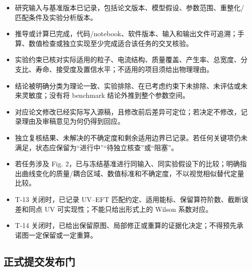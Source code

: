 \documentclass[
]{article}
\providecommand{\tightlist}{%
  \setlength{\itemsep}{0pt}\setlength{\parskip}{0pt}}
\begin{document}
\begin{itemize}
\tightlist
\item[$\square$]
  研究输入与基准版本已记录，包括论文版本、模型假设、参数范围、重整化/匹配条件及实验分析版本。
\item[$\square$]
  推导或计算已完成，代码/notebook、软件版本、输入和输出文件可追溯；手算、数值检查或独立实现至少完成适合该任务的交叉核验。
\item[$\square$]
  实验约束已核对实际适用的粒子、电流结构、质量覆盖、产生率、总宽度、分支比、寿命、接受度及置信水平；不适用的项目须给出物理理由。
\item[$\square$]
  结论被明确分类为理论一致、实验排除、在已考虑约束下未排除、未评估或未来灵敏度；没有将
  benchmark 结论外推到整个参数空间。
\item[$\square$]
  对应论文修改已经实际写入源稿，且修改前后差异可定位；若决定不修改，记录理由及审稿意见为何仍得到回应。
\item[$\square$]
  独立复核结果、未解决的不确定度和剩余适用边界已记录。若任何关键项仍未满足，状态应保留为``进行中''``待独立核查''或``阻塞''。
\item[$\square$]
  若任务涉及 Fig.
  2，已与冻结基准进行同输入、同实验假设下的比较；明确指出曲线变化的质量/耦合区域、数值标准和不确定度，不以视觉相似替代定量比较。
\item[$\square$]
  T-13 关闭时，已记录 UV--EFT
  匹配约定、适用能标、保留算符阶数、截断误差和同点 UV
  可实现性；不能只给出形式上的 Wilson 系数对应。
\item[$\square$]
  T-14
  关闭时，已给出保留原图、局部修正或重算的证据化决定；不得预先承诺图一定保留或一定重算。
\end{itemize}

\subsection{正式提交发布门}\label{ux6b63ux5f0fux63d0ux4ea4ux53d1ux5e03ux95e8}
\end{document}
